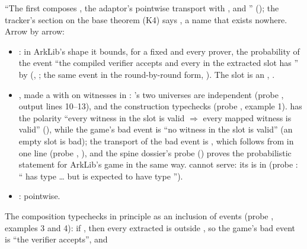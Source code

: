 \enquote{The first composes , the adaptor's pointwise transport
 with , and }
(); the tracker's section on the base theorem (K4) says
, a name that exists nowhere. Arrow by arrow:
\begin{itemize}
\item {}: in ArkLib's shape it bounds, for a fixed
   and every prover, the probability of the event \enquote{the compiled
  verifier accepts and every  in the extracted slot has
  } by 
  (, ; the same event in the
  round-by-round form, ). The slot is an ,
  .
\item {}, made a  with
   on witnesses in :
  's two universes are independent (probe , output lines 10--13), and
  the construction typechecks (probe , example 1).
   has the polarity \enquote{every witness in the slot is valid
  $⇒$ every mapped witness is valid} (), while the game's bad
  event is \enquote{no witness in the slot is valid} (an empty slot is bad); the transport of the
  bad event is , which follows from
   in one line (probe , ), and the spine dossier's
  probe  () proves the probabilistic statement for
  ArkLib's game in the same way.  cannot serve: its 
  is in  (probe : \enquote{
  has type  … but is expected to have type }).
\item {}: pointwise.
\end{itemize}
The composition typechecks in principle as an inclusion of events (probe ,
examples 3 and 4): if , then every extracted  is
outside , so the game's bad event is \enquote{the verifier accepts}, and

